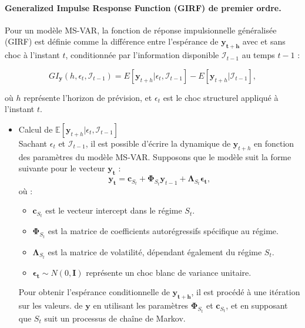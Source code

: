 \begin{sloppypar}
\paragraph{Generalized Impulse Response Function (GIRF) de premier ordre.} Pour un modèle MS-VAR, la fonction de réponse impulsionnelle généralisée (GIRF) est définie comme la différence entre l'espérance de $\bm{y_{t+h}}$ avec et sans choc à l'instant $t$, conditionnée par l'information disponible $\mathcal{I}_{t-1}$ au temps $t-1$ :

\begin{equation}
    GI_{\bm{y}}(h, \epsilon_t, \mathcal{I}_{t-1}) = E[\bm{y}_{t+h} | \epsilon_t, \mathcal{I}_{t-1}] - E[\bm{y}_{t+h} | \mathcal{I}_{t-1}],
\end{equation}

où $h$ représente l'horizon de prévision, et $\epsilon_t$ est le choc structurel appliqué à l'instant $t$.\\

\begin{itemize}
    \item {Calcul de $\mathbb{E}[\bm{y}_{t+h} | \epsilon_t, \mathcal{I}_{t-1}]$}
\\

Sachant $\epsilon_t$ et $\mathcal{I}_{t-1}$, il est possible d’écrire la dynamique de $\bm{y}_{t+h}$ en fonction des paramètres du modèle MS-VAR. Supposons que le modèle suit la forme suivante pour le vecteur $\bm{y_t}$ :
\begin{equation}
    \bm{y_t} = \bm{c}_{S_t} + \bm{\Phi}_{S_t} \bm{y}_{t-1} + \bm{\Lambda}_{S_t} \bm{\epsilon_t},
\end{equation}
où :
\begin{itemize}
    \item $\bm{c}_{S_t}$ est le vecteur intercept dans le régime $S_t$.
    \item $\bm{\Phi}_{S_t}$ est la matrice de coefficients autorégressifs spécifique au régime.
    \item $\bm{\Lambda}_{S_t}$ est la matrice de volatilité, dépendant également du régime $S_t$.
    \item $\bm{\epsilon_t} \sim N(0, \bm{I})$ représente un choc blanc de variance unitaire.
\end{itemize}

Pour obtenir l'espérance conditionnelle de $\bm{y_{t+h}}$, il est procédé à une itération sur les valeurs. de $\bm{y}$ en utilisant les paramètres $\bm{\Phi}_{S_t}$ et $\bm{c}_{S_t}$, et en supposant que $S_t$ suit un processus de chaîne de Markov.


\end{itemize}
\end{sloppypar}

